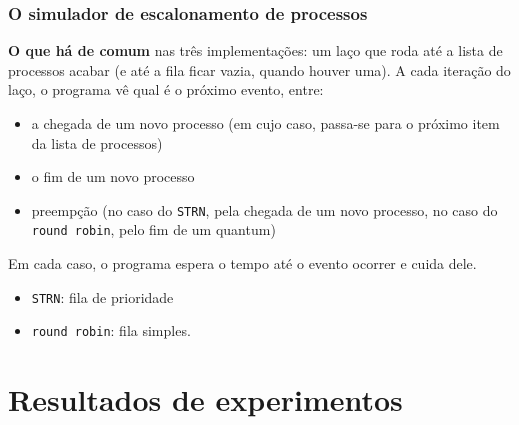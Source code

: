 \documentclass{beamer}
\begin{document}
\begin{frame}[fragile]
  \frametitle{O simulador de escalonamento de processos}
  \textbf{O que há de comum} nas três implementações: um laço que roda
  até a lista de processos acabar (e até a fila ficar vazia, quando
  houver uma). A cada iteração do laço, o programa vê qual é o próximo
  evento, entre:

  \begin{itemize}
    \item a chegada de um novo processo (em cujo caso, passa-se para o
      próximo item da lista de processos)
    \item o fim de um novo processo
    \item preempção (no caso do \verb/STRN/, pela chegada
      de um novo processo, no caso do \verb/round robin/, pelo fim de um
      quantum)
  \end{itemize}

  Em cada caso, o programa espera o tempo até o evento ocorrer e
  cuida dele.

  \begin{itemize}
    \item \verb/STRN/: fila de prioridade
    \item \verb/round robin/: fila simples.
  \end{itemize}

\end{frame}

\section{Resultados de experimentos}
\end{document}
